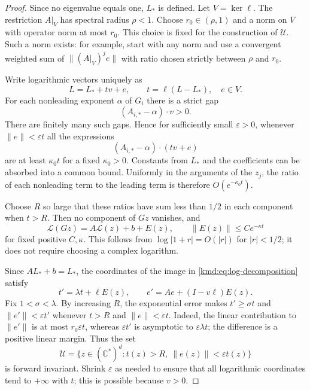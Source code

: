 \documentclass[11pt,a4paper]{article}
\numberwithin{equation}{section}
\theoremstyle{definition}
\theoremstyle{remark}
\newcommand{\C}{\mathbb C}
\newcommand{\calU}{\mathcal U}
\newcommand{\calL}{\mathcal L}
\begin{document}
\begin{proof}
Since no eigenvalue equals one, $L_*$ is defined. Let
$V=\ker\ell$. The restriction $A|_V$ has spectral radius $\rho<1$.
Choose $r_0\in(\rho,1)$ and a norm on $V$ with operator norm at
most $r_0$. This choice is fixed for the construction of $\calU$.
Such a norm exists: for example,
start with any norm and use a convergent weighted sum of
$\|(A|_V)^j e\|$ with ratio chosen strictly between $\rho$ and
$r_0$.

Write logarithmic vectors uniquely as
\begin{equation}
 L=L_*+tv+e,\qquad t=\ell(L-L_*),\quad e\in V.
 \label{kmd:eq:log-decomposition}
\end{equation}
For each nonleading exponent $\alpha$ of $G_i$ there is a strict
gap
\[
 (A_{i,*}-\alpha)\cdot v>0.
\]
There are finitely many such gaps. Hence for sufficiently small
$\varepsilon>0$, whenever $\|e\|<\varepsilon t$ all the
expressions
\[
 (A_{i,*}-\alpha)\cdot(tv+e)
\]
are at least $\kappa_0 t$ for a fixed $\kappa_0>0$. Constants
from $L_*$ and the coefficients can be absorbed into a common
bound. Uniformly in the arguments of the $z_j$, the ratio of each
nonleading term to the leading term is therefore
$O(e^{-\kappa_0t})$.

Choose $R$ so large that these ratios have sum less than $1/2$ in
each component when $t>R$. Then no component of $Gz$ vanishes, and
\begin{equation}
 \calL(Gz)=A\calL(z)+b+E(z),\qquad
 \|E(z)\|\le C e^{-\kappa t}
 \label{kmd:eq:log-error}
\end{equation}
for fixed positive $C,\kappa$. This follows from
$\log|1+r|=O(|r|)$ for $|r|<1/2$; it does not require choosing a
complex logarithm.

Since $AL_*+b=L_*$, the coordinates of the image in
\eqref{kmd:eq:log-decomposition} satisfy
\begin{equation}
 t'=\lambda t+\ell E(z),\qquad
 e'=Ae+(I-v\ell)E(z).
 \label{kmd:eq:te-recurrence}
\end{equation}
Fix $1<\sigma<\lambda$. By increasing $R$, the exponential error
makes $t'\ge\sigma t$ and $\|e'\|<\varepsilon t'$ whenever
$t>R$ and $\|e\|<\varepsilon t$. Indeed, the linear contribution
to $\|e'\|$ is at most $r_0\varepsilon t$, whereas
$\varepsilon t'$ is asymptotic to $\varepsilon\lambda t$;
the difference is a positive linear margin. Thus the set
\begin{equation}
 \calU=\{z\in(\C^*)^d:t(z)>R,\ \|e(z)\|<\varepsilon t(z)\}
 \label{kmd:eq:escape-cone}
\end{equation}
is forward invariant. Shrink $\varepsilon$ as needed to ensure
that all logarithmic coordinates tend to $+\infty$ with $t$;
this is possible because $v>0$.


\end{proof}
\end{document}
